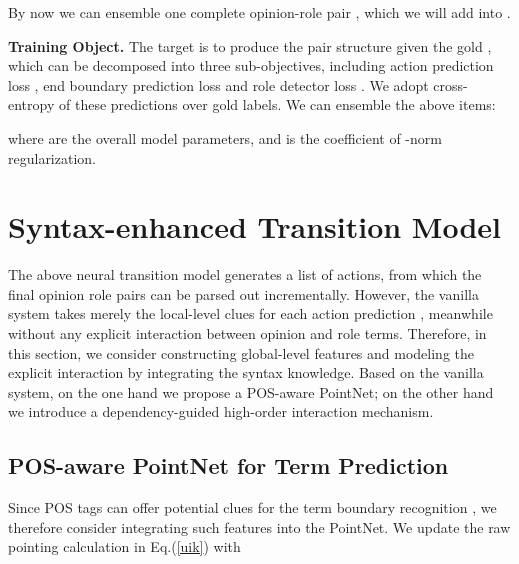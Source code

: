 \documentclass[letterpaper]{article} \usepackage{aaai22}  \usepackage{times}  \usepackage{helvet}  \usepackage{courier}  \usepackage[hyphens]{url}  \usepackage{graphicx} \urlstyle{rm} \def\UrlFont{\rm}  \usepackage{natbib}  \usepackage{caption} \DeclareCaptionStyle{ruled}{labelfont=normalfont,labelsep=colon,strut=off} \frenchspacing  \setlength{\pdfpagewidth}{8.5in}  \setlength{\pdfpageheight}{11in}  \usepackage{algorithm}
\begin{document}
By now we can ensemble one complete opinion-role pair , which we will add into .









\noindent\textbf{Training Object.}
The target is to produce the pair structure  given the gold , which can be decomposed into three sub-objectives, including action prediction loss , end boundary prediction loss  and role detector loss  .
We adopt cross-entropy of these predictions over gold labels.
We can ensemble the above items:

where 
 are the overall model parameters, and  is the coefficient of -norm regularization.












\section{Syntax-enhanced Transition Model}







The above neural transition model generates a list of actions, from which the final opinion role pairs can be parsed out incrementally.
However, the vanilla system takes merely the local-level clues for each action prediction \cite{LiZP20}, meanwhile without any explicit interaction between opinion and role terms.
Therefore, in this section, we consider constructing global-level features and modeling the explicit interaction by integrating the syntax knowledge.
Based on the vanilla system, on the one hand we propose a POS-aware PointNet; on the other hand we introduce a dependency-guided high-order interaction mechanism.




 
\subsection{POS-aware PointNet for Term Prediction}

Since POS tags can offer potential clues for the term boundary recognition \cite{NieTSAW20,Wu0RJL21}, we therefore consider integrating such features into the PointNet.
We update the raw pointing calculation in Eq.(\ref{uik}) with
 
\end{document}
